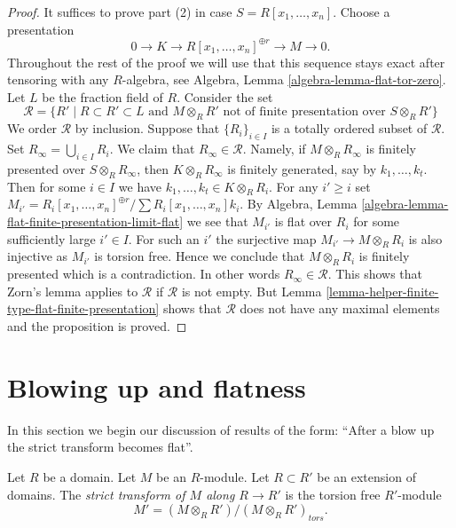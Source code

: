 \begin{proof}
It suffices to prove part (2) in case $S = R[x_1, \ldots, x_n]$.
Choose a presentation
$$
0 \to K \to R[x_1, \ldots, x_n]^{\oplus r} \to M \to 0.
$$
Throughout the rest of the proof we will use that this sequence stays exact
after tensoring with any $R$-algebra, see
Algebra, Lemma \ref{algebra-lemma-flat-tor-zero}.
Let $L$ be the fraction field of $R$.
Consider the set
$$
\mathcal{R} = \{R' \mid
R \subset R' \subset L
\text{ and }
M \otimes_R R'
\text{ not of finite presentation over }
S \otimes_R R'\}
$$
We order $\mathcal{R}$ by inclusion. Suppose that
$\{R_i\}_{i \in I}$ is a totally ordered subset of $\mathcal{R}$.
Set $R_{\infty} = \bigcup_{i \in I} R_i$.
We claim that $R_\infty \in \mathcal{R}$.
Namely, if $M \otimes_R R_{\infty}$ is finitely presented over
$S \otimes_R R_\infty$, then $K \otimes_R R_\infty$ is finitely
generated, say by $k_1, \ldots, k_t$. Then for some $i\in I$
we have $k_1, \ldots, k_t \in K \otimes_R R_i$. For any
$i' \geq i$ set
$M_{i'} = R_i[x_1, \ldots, x_n]^{\oplus r}/\sum R_i[x_1, \ldots, x_n]k_i$.
By
Algebra, Lemma \ref{algebra-lemma-flat-finite-presentation-limit-flat}
we see that $M_{i'}$ is flat over $R_i$ for some sufficiently large
$i' \in I$. For such an $i'$ the surjective map
$M_{i'} \to M \otimes_R R_i$ is also injective as
$M_{i'}$ is torsion free. Hence we conclude that
$M \otimes_R R_i$ is finitely presented which is a contradiction.
In other words $R_\infty \in \mathcal{R}$.
This shows that Zorn's lemma applies to $\mathcal{R}$ if $\mathcal{R}$
is not empty. But
Lemma \ref{lemma-helper-finite-type-flat-finite-presentation}
shows that $\mathcal{R}$ does not have any maximal elements and the
proposition is proved.
\end{proof}




\section{Blowing up and flatness}
\label{section-blowup-flat}

\noindent
In this section we begin our discussion of results of the form: ``After a
blow up the strict transform becomes flat''.

\begin{definition}
\label{definition-strict-transform}
Let $R$ be a domain.
Let $M$ be an $R$-module.
Let $R \subset R'$ be an extension of domains.
The {\it strict transform of $M$ along $R \to R'$} is
the torsion free $R'$-module
$$
M' = (M \otimes_R R')/(M \otimes_R R')_{tors}.
$$
\end{definition}

